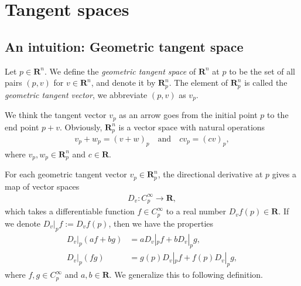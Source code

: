
\chapter{Tangent spaces}

\begin{comment}
    \begin{definition}[Germ]
        Let $C^\infty_p$ be the set of all smooth function defined on some neighborhood of $p$. Let $f, g \in C^\infty_p$ with domains $U$ and $V$, respectively. We define the equivalence relation $f \sim g$ if there exists an open set $W \subset V \cap U$ such that $f = g$ on $W$. We denote the equivalence class of $f$ by $[f]$, which is called a \emph{$C^\infty$-germ} of $f$ at $p$.
    \end{definition}
    \end{comment}

\section{An intuition: Geometric tangent space}

\begin{definition}
    Let $p \in \mathbf{R}^n$. We define the \emph{geometric tangent space} of $\mathbf{R}^n$ at $p$ to be the set of all pairs $(p, v)$ for $v \in \mathbf{R}^n$, and denote it by $\mathbf{R}^n_p$. The element of $\mathbf{R}^n_p$ is called the \emph{geometric tangent vector}, we abbreviate $(p, v)$ as $v_p$.
\end{definition}

We think the tangent vector $v_p$ as an arrow goes from the initial point $p$ to the end point $p + v$. Obviously, $\mathbf{R}^n_p$ is a vector space with natural operations
    \begin{align*}
        v_p + w_p = (v + w)_p
        \quad\text{and}\quad
        cv_p = (cv)_p,
    \end{align*}
where $v_p, w_p \in \mathbf{R}^n_p$ and $c \in \mathbf{R}$.

For each geometric tangent vector $v_p \in \mathbf{R}^n_p$, the directional derivative at $p$ gives a map of vector spaces
    \begin{align*}
        D_v : C^\infty_p \to \mathbf{R},
    \end{align*}
which takes a differentiable function $f \in C^\infty_p$ to a real number $D_vf(p) \in \mathbf{R}$. If we denote $D_v|_p f := D_vf(p)$, then we have the properties
    \begin{align*}
        D_v|_p(a f + bg) &= aD_v|_pf + bD_v|_pg,\\
        D_v|_p(fg) &= g(p)D_v|_pf + f(p)D_v|_pg,
    \end{align*}
where $f, g \in C^\infty_p$ and $a, b \in \mathbf{R}$. We generalize this to following definition.

